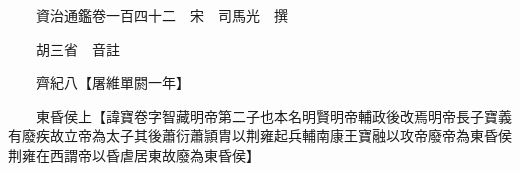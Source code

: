 










 


 
 


 

  
  
  
  
  





  
  
  
  
  
 
  

  

  
  
  



  

 
 

  
   




  

  
  


  　　資治通鑑卷一百四十二　宋　司馬光　撰

　　胡三省　音註

　　齊紀八【屠維單閼一年】

　　東昏侯上【諱寶卷字智藏明帝第二子也本名明賢明帝輔政後改焉明帝長子寶義有廢疾故立帝為太子其後蕭衍蕭頴胄以荆雍起兵輔南康王寶融以攻帝廢帝為東昏侯荆雍在西謂帝以昏虐居東故廢為東昏侯】

